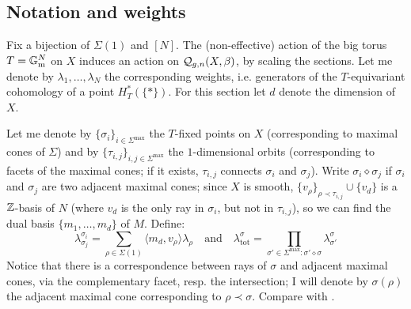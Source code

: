 \subsection{Notation and weights} Fix a bijection of $\Sigma(1)$ and $[N]$. The (non-effective) action of the big torus $T=\mathbb{G}_{\text{m}}^N$ on $X$ induces an action on $\mathcal{Q}_{g,n}(X,\beta)$, by scaling the sections. Let me denote by $\lambda_1,\ldots,\lambda_N$ the corresponding weights, i.e. generators of the $T$-equivariant cohomology of a point $H^*_T(\{*\})$. For this section let $d$ denote the dimension of $X$.

Let me denote by $\{\sigma_i\}_{i\in\Sigma^\text{max}}$  the $T$-fixed points on $X$ (corresponding to maximal cones of $\Sigma$) and by $\{\tau_{i,j}\}_{i,j\in\Sigma^\text{max}}$ the $1$-dimensional orbits (corresponding to facets of the maximal cones; if it exists, $\tau_{i,j}$ connects $\sigma_i$ and $\sigma_j$).
Write $\sigma_i\diamond\sigma_j$ if $\sigma_i$ and $\sigma_j$ are two adjacent maximal cones; since $X$ is smooth, $\{v_\rho\}_{\rho\prec\tau_{i,j}}\cup\{v_d\}$ is a $\mathbb{Z}$-basis of $N$ (where $v_d$ is the only ray in $\sigma_i$, but not in $\tau_{i,j}$), so we can find the dual basis $\{m_1,\ldots,m_d\}$ of $M$. Define: \[\lambda^{\sigma_i}_{\sigma_j}=\sum_{\rho\in\Sigma(1)}\langle m_d,v_\rho\rangle\lambda_\rho \quad \text{and} \quad \lambda^{\sigma}_{\text{tot}}=\prod_{\sigma'\in\Sigma^{\text{max}}\colon\sigma'\diamond\sigma}\lambda^\sigma_{\sigma'}\] Notice that there is a correspondence between rays of $\sigma$ and adjacent maximal cones, via the complementary facet, resp. the intersection; I will denote by $\sigma(\rho)$ the adjacent maximal cone corresponding to $\rho\prec\sigma$. Compare with \cite[\S\S 6.4 and 7.3]{HolgerSpielberg}.


